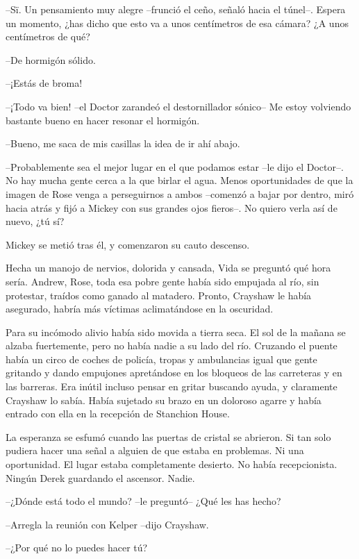 {--Sï. Un pensamiento muy alegre --frunció el ceño, señaló hacia el
 túnel--. Espera un momento, ¿has dicho que esto va a unos centímetros de
esa cámara? ¿A unos centímetros de qué?}

{--De hormigón sólido.}

{--¡Estás de broma!}

{--¡Todo va bien! --el Doctor zarandeó el destornillador sónico-- Me
estoy volviendo bastante bueno en hacer resonar el hormigón.}

{--Bueno, me saca de mis casillas la idea de ir ahí abajo.}

{--Probablemente sea el mejor lugar en el que podamos estar --le dijo el
 Doctor--. No hay mucha gente cerca a la que birlar el agua. Menos
 oportunidades de que la imagen de Rose venga a perseguirnos a ambos
 --comenzó a bajar por dentro, miró hacia atrás y fijó a Mickey con sus
grandes ojos fieros--. No quiero verla así de nuevo, ¿tú sí?}

{Mickey se metió tras él, y comenzaron su cauto descenso.}

\mbox{}

{Hecha un manojo de nervios, dolorida y cansada, Vida se preguntó qué
 hora sería. Andrew, Rose, toda esa pobre gente había sido empujada al
 río, sin protestar, traídos como ganado al matadero. Pronto, Crayshaw le
había asegurado, habría más víctimas aclimatándose en la oscuridad.}

{Para su incómodo alivio había sido movida a tierra seca. El sol de la
 mañana se alzaba fuertemente, pero no había nadie a su lado del río.
 Cruzando el puente había un circo de coches de policía, tropas y
 ambulancias igual que gente gritando y dando empujones apretándose en
 los bloqueos de las carreteras y en las barreras. Era inútil incluso
 pensar en gritar buscando ayuda, y claramente Crayshaw lo sabía. Había
 sujetado su brazo en un doloroso agarre y había entrado con ella en la
recepción de Stanchion House.}

{La esperanza se esfumó cuando las puertas de cristal se abrieron. Si
 tan solo pudiera hacer una señal a alguien de que estaba en problemas.
 Ni una oportunidad. El lugar estaba completamente desierto. No había
recepcionista. Ningún Derek guardando el ascensor. Nadie.}

{--¿Dónde está todo el mundo? --le preguntó-- ¿Qué les has hecho?}

{--Arregla la reunión con Kelper --dijo Crayshaw.}

{--¿Por qué no lo puedes hacer tú?}

